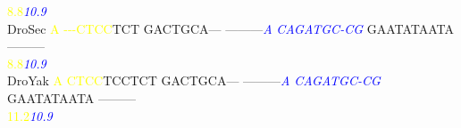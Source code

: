 \documentclass[11pt,twoside,reqno,a4paper]{article}
\begin{document}
{\hspace*{7\charwidth}\hspace*{0\charwidth}\textcolor{Yellow}{8.8}\hspace*{1\charwidth}\hspace*{1\charwidth}\hspace*{1\charwidth}\hspace*{27\charwidth}\textit{\textcolor{Blue}{10.9}}\hspace*{1\charwidth}\hspace*{1\charwidth}\hspace*{1\charwidth}\\
DroSec	\textcolor{Yellow}{A}	\textcolor{Yellow}{-}\textcolor{Yellow}{-}\textcolor{Yellow}{-}\textcolor{Yellow}{C}\textcolor{Yellow}{T}\textcolor{Yellow}{C}\textcolor{Yellow}{C}TCT	GACTGCA---	---------\textit{\textcolor{Blue}{A}}	\textit{\textcolor{Blue}{C}}\textit{\textcolor{Blue}{A}}\textit{\textcolor{Blue}{G}}\textit{\textcolor{Blue}{A}}\textit{\textcolor{Blue}{T}}\textit{\textcolor{Blue}{G}}\textit{\textcolor{Blue}{C}}\textit{\textcolor{Blue}{-}}\textit{\textcolor{Blue}{C}}\textit{\textcolor{Blue}{G}}	GAATATAATA	---------\\
\hspace*{7\charwidth}\hspace*{0\charwidth}\textcolor{Yellow}{8.8}\hspace*{1\charwidth}\hspace*{1\charwidth}\hspace*{1\charwidth}\hspace*{27\charwidth}\textit{\textcolor{Blue}{10.9}}\hspace*{1\charwidth}\hspace*{1\charwidth}\hspace*{1\charwidth}\\
DroYak	\textcolor{Yellow}{A}	\textcolor{Yellow}{C}\textcolor{Yellow}{T}\textcolor{Yellow}{C}\textcolor{Yellow}{C}TCCTCT	GACTGCA---	---------\textit{\textcolor{Blue}{A}}	\textit{\textcolor{Blue}{C}}\textit{\textcolor{Blue}{A}}\textit{\textcolor{Blue}{G}}\textit{\textcolor{Blue}{A}}\textit{\textcolor{Blue}{T}}\textit{\textcolor{Blue}{G}}\textit{\textcolor{Blue}{C}}\textit{\textcolor{Blue}{-}}\textit{\textcolor{Blue}{C}}\textit{\textcolor{Blue}{G}}	GAATATAATA	---------\\
\hspace*{7\charwidth}\hspace*{0\charwidth}\textcolor{Yellow}{11.2}\hspace*{1\charwidth}\hspace*{1\charwidth}\hspace*{1\charwidth}\hspace*{26\charwidth}\textit{\textcolor{Blue}{10.9}}\hspace*{1\charwidth}\hspace*{1\charwidth}\hspace*{1\charwidth}\\
}
\end{document}
